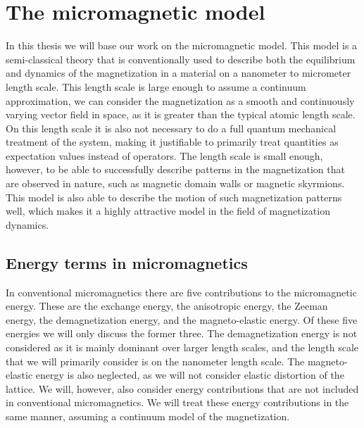 \chapter{The micromagnetic model}
In this thesis we will base our work on the micromagnetic model. This model is a semi-classical theory that is conventionally used to describe both the equilibrium and dynamics of the magnetization in a material on a nanometer to micrometer length scale. This length scale is large enough to assume a continuum approximation, we can consider the magnetization as a smooth and continuously varying vector field in space, as it is greater than the typical atomic length scale. On this length scale it is also not necessary to do a full quantum mechanical treatment of the system, making it justifiable to primarily treat quantities as expectation values instead of operators. The length scale is small enough, however, to be able to successfully describe patterns in the magnetization that are observed in nature, such as magnetic domain walls or magnetic skyrmions. This model is also able to describe the motion of such magnetization patterns well, which makes it a highly attractive model in the field of magnetization dynamics.
\section{Energy terms in micromagnetics}
In conventional micromagnetics there are five contributions to the micromagnetic energy. These are the exchange energy, the anisotropic energy, the Zeeman energy, the demagnetization energy, and the magneto-elastic energy. Of these five energies we will only discuss the former three. The demagnetization energy is not considered as it is mainly dominant over larger length scales, and the length scale that we will primarily consider is on the nanometer length scale. The magneto-elastic energy is also neglected, as we will not consider elastic distortion of the lattice. We will, however, also consider energy contributions that are not included in conventional micromagnetics. We will treat these energy contributions in the same manner, assuming a continuum model of the magnetization.
